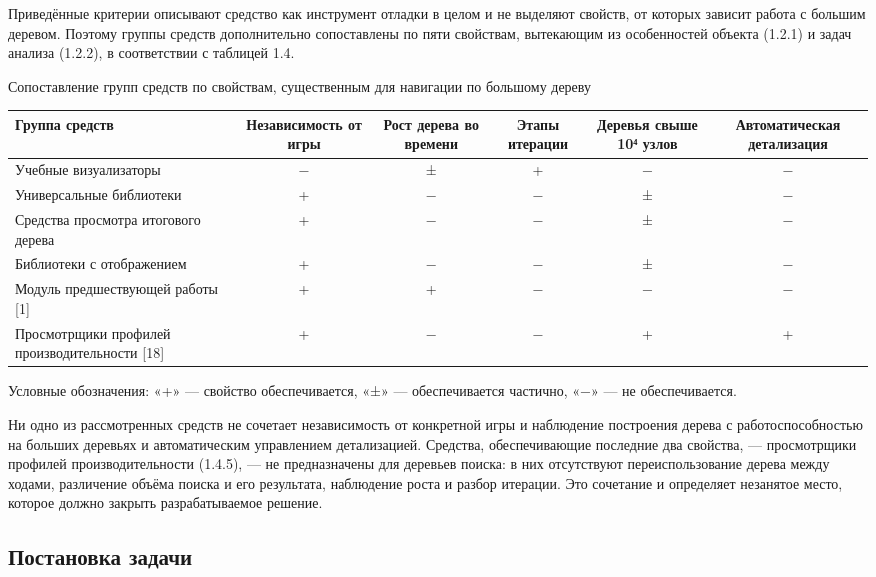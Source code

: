 Приведённые критерии описывают средство как инструмент отладки в целом и не выделяют свойств, от которых зависит работа с большим деревом. Поэтому группы средств дополнительно сопоставлены по пяти свойствам, вытекающим из особенностей объекта (1.2.1) и задач анализа (1.2.2), в соответствии с таблицей 1.4.

\begin{gosttable}{}{Сопоставление групп средств по свойствам, существенным для навигации по большому дереву}

\begin{tabularx}{\linewidth}{>{\raggedright\arraybackslash}Xccccc}
\hline
Группа средств & Независимость от игры & Рост дерева во времени & Этапы итерации & Деревья свыше 10⁴ узлов & Автоматическая детализация \\
\hline
Учебные визуализаторы & − & ± & + & − & − \\
\hline
Универсальные библиотеки & + & − & − & ± & − \\
\hline
Средства просмотра итогового дерева & + & − & − & ± & − \\
\hline
Библиотеки с отображением & + & − & − & ± & − \\
\hline
Модуль предшествующей работы [1] & + & + & − & − & − \\
\hline
Просмотрщики профилей производительности [18] & + & − & − & + & + \\
\hline
\end{tabularx}

\end{gosttable}

Условные обозначения: «+» — свойство обеспечивается, «±» — обеспечивается частично, «−» — не обеспечивается.

Ни одно из рассмотренных средств не сочетает независимость от конкретной игры и наблюдение построения дерева с работоспособностью на больших деревьях и автоматическим управлением детализацией. Средства, обеспечивающие последние два свойства, — просмотрщики профилей производительности (1.4.5), — не предназначены для деревьев поиска: в них отсутствуют переиспользование дерева между ходами, различение объёма поиска и его результата, наблюдение роста и разбор итерации. Это сочетание и определяет незанятое место, которое должно закрыть разрабатываемое решение.

\subsection{Постановка задачи}

